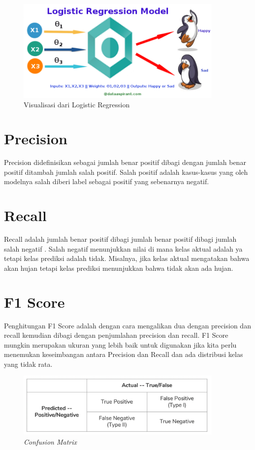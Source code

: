 \begin{figure}[!ht]
	\centering\includegraphics[width=0.9\textwidth]{bab2/figures/logistic.png}
	\caption{Visualisasi dari Logistic Regression\cite{logistic_def}}
	\label{fig:abstraksi1}
\end{figure}
\section{Precision}
\par Precision didefinisikan sebagai jumlah benar positif dibagi dengan jumlah benar positif ditambah jumlah salah positif. Salah positif adalah kasus-kasus yang oleh modelnya salah diberi label sebagai positif yang sebenarnya negatif\cite{precisionrecall}.

\section{Recall}
\par Recall adalah jumlah benar positif dibagi jumlah benar positif dibagi jumlah salah negatif \cite{precisionrecall}. Salah negatif menunjukkan nilai di mana kelas aktual adalah ya tetapi kelas prediksi adalah tidak. Misalnya, jika kelas aktual mengatakan bahwa akan hujan tetapi kelas prediksi menunjukkan bahwa tidak akan ada hujan.

\section{F1 Score}
\par Penghitungan F1 Score adalah dengan cara mengalikan dua dengan precision dan recall kemudian dibagi dengan penjumlahan precision dan recall. F1 Score mungkin merupakan ukuran yang lebih baik untuk digunakan jika kita perlu menemukan keseimbangan antara Precision dan Recall dan ada distribusi kelas yang tidak rata\cite{f1score_def}.

\begin{figure}[!ht]
	\centering\includegraphics[width=0.9\textwidth]{bab2/figures/confusion.png}
	\caption{\textit{Confusion Matrix}\cite{precisionrecall}}
	\label{fig:conf}
\end{figure}

